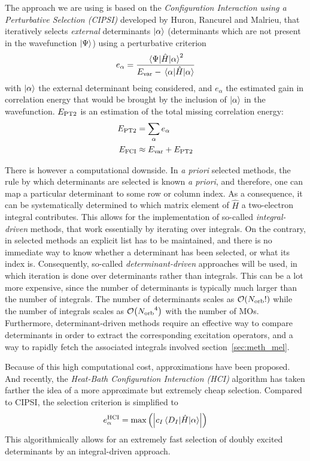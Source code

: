 \documentclass[./thesis.tex]{subfiles}
\begin{document}
The approach we are using is based on the \emph{Configuration Interaction using a Perturbative Selection (CIPSI)} developed by Huron, Rancurel and Malrieu,\cite{Huron_1973} that iteratively selects \emph{external} determinants ${\ket{\alpha}}$ (determinants which are not present in the wavefunction $\ket \Psi$) using a perturbative criterion
\begin{equation}
e_\alpha = \frac{\mel{\Psi}{\hat{H}}{\alpha}^2}{E_\text{var} - \mel{\alpha}{\hat{H}}{\alpha}}
\end{equation}
with $\ket \alpha$ the external determinant being considered, and $e_\alpha$ the estimated gain in correlation energy that would be brought by the inclusion of $\ket \alpha$ in the wavefunction. $E_\text{PT2}$ is an estimation of the total missing correlation energy:
\begin{align}
E_\text{PT2} & = \sum_{\alpha} e_\alpha \\
E_\text{FCI} & \approx E_\text{var} + E_\text{PT2}
\end{align}

There is however a computational downside. In \textit{a priori} selected methods, the rule by which determinants are selected is known \textit{a priori}, and therefore, one can map a particular determinant to some row or column index.\cite{Knowles_1984} As a consequence, it can be systematically determined to which matrix element of $\widehat{H}$ a two-electron integral contributes. This allows for the implementation of so-called \emph{integral-driven} methods, that work essentially by iterating over integrals.
On the contrary, in selected methods an explicit list has to be maintained, and there is no immediate way to know whether a determinant has been selected, or what its index is. Consequently, so-called \emph{determinant-driven} approaches will be used, in which iteration is done over determinants rather than integrals. This can be a lot more expensive, since the number of determinants is typically much larger than the number of integrals. The number of determinants scales as $\order{\Norb!}$ while the number of integrals scales as $\order{\Norb^4}$ with the number of MOs.
Furthermore, determinant-driven methods require an effective way to compare determinants in order to extract the corresponding excitation operators, and a way to rapidly fetch the associated integrals involved section~\ref{sec:meth_mel}.

Because of this high computational cost, approximations have been proposed.\cite{Evangelisti_1983} And recently, the \emph{Heat-Bath Configuration Interaction (HCI)} algorithm has taken farther the idea of a more approximate but extremely cheap selection.\cite{Holmes_2016, Sharma_2017} Compared to CIPSI, the selection criterion is simplified to
\begin{equation}
e^{\text{HCI}}_\alpha = \max \qty( \qty| c_I \mel{D_I}{\hat{H}}{\alpha} | )
\end{equation}
This algorithmically allows for an extremely fast selection of doubly
excited determinants by an integral-driven approach.
\end{document}
